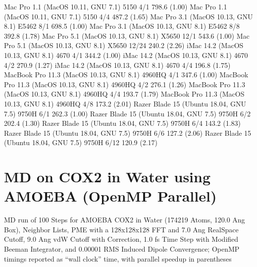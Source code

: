 \documentclass[letterpaper,11pt,english]{sphinxmanual}
\begin{document}
\begin{sphinxVerbatim}[commandchars=\\\{\}]
Mac Pro 1.1 (MacOS 10.11, GNU 7.1)             5150           4/1        798.6 (1.00)
Mac Pro 1.1 (MacOS 10.11, GNU 7.1)             5150           4/4        487.2 (1.65)
Mac Pro 3.1 (MacOS 10.13, GNU 8.1)            E5462           8/1        698.5 (1.00)
Mac Pro 3.1 (MacOS 10.13, GNU 8.1)            E5462           8/8        392.8 (1.78)
Mac Pro 5.1 (MacOS 10.13, GNU 8.1)            X5650          12/1        543.6 (1.00)
Mac Pro 5.1 (MacOS 10.13, GNU 8.1)            X5650         12/24        240.2 (2.26)
iMac 14.2 (MacOS 10.13, GNU 8.1)               4670           4/1        344.2 (1.00)
iMac 14.2 (MacOS 10.13, GNU 8.1)               4670           4/2        270.9 (1.27)
iMac 14.2 (MacOS 10.13, GNU 8.1)               4670           4/4        196.8 (1.75)
MacBook Pro 11.3 (MacOS 10.13, GNU 8.1)      4960HQ           4/1        347.6 (1.00)
MacBook Pro 11.3 (MacOS 10.13, GNU 8.1)      4960HQ           4/2        276.1 (1.26)
MacBook Pro 11.3 (MacOS 10.13, GNU 8.1)      4960HQ           4/4        193.7 (1.79)
MacBook Pro 11.3 (MacOS 10.13, GNU 8.1)      4960HQ           4/8        173.2 (2.01)
Razer Blade 15 (Ubuntu 18.04, GNU 7.5)        9750H           6/1        262.3 (1.00)
Razer Blade 15 (Ubuntu 18.04, GNU 7.5)        9750H           6/2        202.4 (1.30)
Razer Blade 15 (Ubuntu 18.04, GNU 7.5)        9750H           6/4        143.2 (1.83)
Razer Blade 15 (Ubuntu 18.04, GNU 7.5)        9750H           6/6        127.2 (2.06)
Razer Blade 15 (Ubuntu 18.04, GNU 7.5)        9750H          6/12        120.9 (2.17)
\end{sphinxVerbatim}


\section{MD on COX\sphinxhyphen{}2 in Water using AMOEBA (OpenMP Parallel)}
\label{\detokenize{text/benchmarks:md-on-cox-2-in-water-using-amoeba-openmp-parallel}}
MD run of 100 Steps for AMOEBA COX\sphinxhyphen{}2 in Water (174219 Atoms, 120.0 Ang Box), Neighbor Lists, PME with a 128x128x128 FFT and 7.0 Ang Real\sphinxhyphen{}Space Cutoff, 9.0 Ang vdW Cutoff with Correction, 1.0 fs Time Step with Modified Beeman Integrator, and 0.00001 RMS Induced Dipole Convergence; OpenMP timings reported as “wall clock” time, with parallel speedup in parentheses

\end{document}
